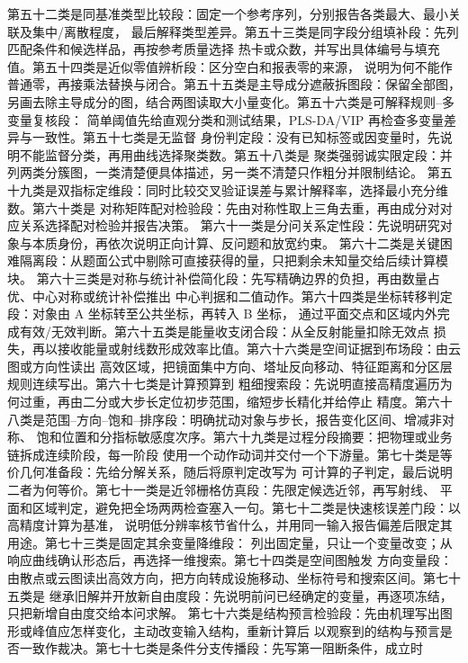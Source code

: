 第五十二类是同基准类型比较段：固定一个参考序列，分别报告各类最大、最小关联及集中/离散程度，
最后解释类型差异。第五十三类是同字段分组填补段：先列匹配条件和候选样品，再按参考质量选择
热卡或众数，并写出具体编号与填充值。第五十四类是近似零值辨析段：区分空白和报表零的来源，
说明为何不能作普通零，再接乘法替换与闭合。第五十五类是主导成分遮蔽拆图段：保留全部图，
另画去除主导成分的图，结合两图读取大小量变化。第五十六类是可解释规则--多变量复核段：
简单阈值先给直观分类和测试结果，PLS-DA/VIP 再检查多变量差异与一致性。第五十七类是无监督
身份判定段：没有已知标签或因变量时，先说明不能监督分类，再用曲线选择聚类数。第五十八类是
聚类强弱诚实限定段：并列两类分簇图，一类清楚便具体描述，另一类不清楚只作粗分并限制结论。
第五十九类是双指标定维段：同时比较交叉验证误差与累计解释率，选择最小充分维数。第六十类是
对称矩阵配对检验段：先由对称性取上三角去重，再由成分对对应关系选择配对检验并报告决策。
第六十一类是分问关系定性段：先说明研究对象与本质身份，再依次说明正向计算、反问题和放宽约束。
第六十二类是关键困难隔离段：从题面公式中剔除可直接获得的量，只把剩余未知量交给后续计算模块。
第六十三类是对称与统计补偿简化段：先写精确边界的负担，再由数量占优、中心对称或统计补偿推出
中心判据和二值动作。第六十四类是坐标转移判定段：对象由 A 坐标转至公共坐标，再转入 B 坐标，
通过平面交点和区域内外完成有效/无效判断。第六十五类是能量收支闭合段：从全反射能量扣除无效点
损失，再以接收能量或射线数形成效率比值。第六十六类是空间证据到布场段：由云图或方向性读出
高效区域，把镜面集中方向、塔址反向移动、特征距离和分区层规则连续写出。第六十七类是计算预算到
粗细搜索段：先说明直接高精度遍历为何过重，再由二分或大步长定位初步范围，缩短步长精化并给停止
精度。第六十八类是范围--方向--饱和--排序段：明确扰动对象与步长，报告变化区间、增减非对称、
饱和位置和分指标敏感度次序。第六十九类是过程分段摘要：把物理或业务链拆成连续阶段，每一阶段
使用一个动作动词并交付一个下游量。第七十类是等价几何准备段：先给分解关系，随后将原判定改写为
可计算的子判定，最后说明二者为何等价。第七十一类是近邻栅格仿真段：先限定候选近邻，再写射线、
平面和区域判定，避免把全场两两检查塞入一句。第七十二类是快速核误差门段：以高精度计算为基准，
说明低分辨率核节省什么，并用同一输入报告偏差后限定其用途。第七十三类是固定其余变量降维段：
列出固定量，只让一个变量改变；从响应曲线确认形态后，再选择一维搜索。第七十四类是空间图触发
方向变量段：由散点或云图读出高效方向，把方向转成设施移动、坐标符号和搜索区间。第七十五类是
继承旧解并开放新自由度段：先说明前问已经确定的变量，再逐项冻结，只把新增自由度交给本问求解。
第七十六类是结构预言检验段：先由机理写出图形或峰值应怎样变化，主动改变输入结构，重新计算后
以观察到的结构与预言是否一致作裁决。第七十七类是条件分支传播段：先写第一阻断条件，成立时
